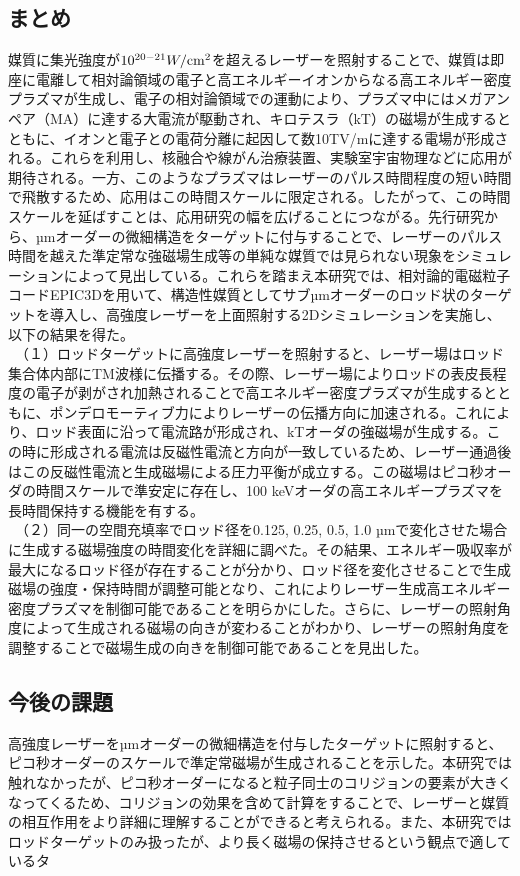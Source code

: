 \documentclass[a4paper,11pt,titlepage]{jarticle}
\numberwithin{equation}{section} %
\begin{document}
\subsection{まとめ}
媒質に集光強度が$10^{20-21} W/ \rm{cm}^2$を超えるレーザーを照射することで、媒質は即座に電離して相対論領域の電子と高エネルギーイオンからなる高エネルギー密度プラズマが生成し、電子の相対論領域での運動により、プラズマ中にはメガアンペア（MA）に達する大電流が駆動され、キロテスラ（kT）の磁場が生成するとともに、イオンと電子との電荷分離に起因して数10TV/mに達する電場が形成される。これらを利用し、核融合や線がん治療装置、実験室宇宙物理などに応用が期待される。一方、このようなプラズマはレーザーのパルス時間程度の短い時間で飛散するため、応用はこの時間スケールに限定される。したがって、この時間スケールを延ばすことは、応用研究の幅を広げることにつながる。先行研究から、µmオーダーの微細構造をターゲットに付与することで、レーザーのパルス時間を越えた準定常な強磁場生成等の単純な媒質では見られない現象をシミュレーションによって見出している。これらを踏まえ本研究では、相対論的電磁粒子コードEPIC3D\cite{m4}を用いて、構造性媒質としてサブµmオーダーのロッド状のターゲットを導入し、高強度レーザーを上面照射する2Dシミュレーションを実施し、以下の結果を得た。\\
　（１）ロッドターゲットに高強度レーザーを照射すると、レーザー場はロッド集合体内部にTM波様に伝播する。その際、レーザー場によりロッドの表皮長程度の電子が剥がされ加熱されることで高エネルギー密度プラズマが生成するとともに、ポンデロモーティブ力によりレーザーの伝播方向に加速される。これにより、ロッド表面に沿って電流路が形成され、kTオーダの強磁場が生成する。この時に形成される電流は反磁性電流と方向が一致しているため、レーザー通過後はこの反磁性電流と生成磁場による圧力平衡が成立する。この磁場はピコ秒オーダの時間スケールで準安定に存在し、100 keVオーダの高エネルギープラズマを長時間保持する機能を有する。\\
　（２）同一の空間充填率でロッド径を0.125, 0.25, 0.5, 1.0 µmで変化させた場合に生成する磁場強度の時間変化を詳細に調べた。その結果、エネルギー吸収率が最大になるロッド径が存在することが分かり、ロッド径を変化させることで生成磁場の強度・保持時間が調整可能となり、これによりレーザー生成高エネルギー密度プラズマを制御可能であることを明らかにした。さらに、レーザーの照射角度によって生成される磁場の向きが変わることがわかり、レーザーの照射角度を調整することで磁場生成の向きを制御可能であることを見出した。


\subsection{今後の課題}
高強度レーザーをµmオーダーの微細構造を付与したターゲットに照射すると、ピコ秒オーダーのスケールで準定常磁場が生成されることを示した。本研究では触れなかったが、ピコ秒オーダーになると粒子同士のコリジョンの要素が大きくなってくるため、コリジョンの効果を含めて計算をすることで、レーザーと媒質の相互作用をより詳細に理解することができると考えられる。また、本研究ではロッドターゲットのみ扱ったが、より長く磁場の保持させるという観点で適しているタ
\end{document}
